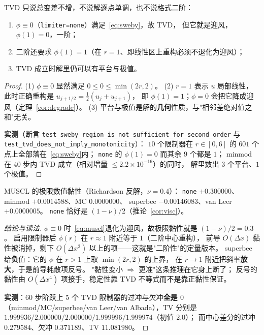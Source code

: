 \begin{theorem}
\label{thm:notmono}
TVD 只说总变差不增，不说解逐点单调，也不说格式二阶：
\begin{enumerate}
  \item $\phi\equiv0$（\texttt{limiter=none}）满足~\eqref{eq:sweby}，故 TVD，
        但它就是迎风，$\phi(1)=0$，一阶；
  \item 二阶还要求 $\phi(1)=1$（在 $r=1$、即线性区上重构必须不退化为迎风）；
  \item TVD 成立时解里仍可以有平台与极值。
\end{enumerate}
\end{theorem}

\begin{proof}
(1) $\phi\equiv0$ 显然满足 $0\le0\le\min(2r,2)$。
(2) $r=1$ 表示 $u$ 局部线性，此时正确重构是 $u_{j+1/2}=\tfrac12(u_j+u_{j+1})$，
即 $\phi(1)=1$；$\phi=0$ 会把它降成迎风（定理~\ref{cor:degrade}）。
(3) 平台与极值是解的\textbf{几何}性质，与"相邻差绝对值之和"无关。

\textbf{实测}（断言 \texttt{test\_sweby\_region\_is\_not\_sufficient\_for\_second\_order}
与 \texttt{test\_tvd\_does\_not\_imply\_monotonicity}）：
$10$ 个限制器在 $r\in[0,6]$ 的 $601$ 个点上全部落在~\eqref{eq:sweby}内；
\texttt{none} 的 $\phi(1)=0$ 而其余 $9$ 个都是 $1$；
minmod 在 $40$ 步内 TVD 成立（相对增量 $\le2.2\times10^{-16}$）的同时，
解里数出 $3$ 个平台、$1$ 个极值。
\end{proof}

\begin{theorem}
\label{thm:limvisc}
MUSCL 的极限数值黏性（Richardson 反解，$\nu=0.4$）：
\texttt{none} $+0.300000$、minmod $+0.0014588$、MC $0.0000000$、
superbee $\mathbf{-0.00146083}$、van Leer $+0.0000005$。
\texttt{none} 恰好是 $(1-\nu)/2$（推论~\ref{cor:visc}）。
\end{theorem}

\begin{proof}[结论与读法]
$\phi\equiv0$ 时~\eqref{eq:muscl}退化为迎风，故极限黏性就是 $(1-\nu)/2=0.3$。
启用限制器后 $\phi(r)$ 在 $r\approx1$ 附近等于 $1$（二阶中心重构），
前导 $O(\Delta x)$ 黏性被消掉，剩下 $O(\Delta x^2)$ 以上的项——这就是"二阶性"的定量版本。
superbee 给\textbf{负}值：它的 $\phi$ 在 $r>1$ 上取 $\min(2r,2)$ 的上界，
在 $r\to1$ 附近把斜率\textbf{放大}，于是前导耗散项反号。
"黏性变小 $\Rightarrow$ 更准"这条推理在它身上断了；
反号的黏性由 $O(\Delta x^4)$ 项接手，稳定性靠 TVD 不等式而不是靠正黏性保证。

\textbf{实测}：$60$ 步阶跃上 $5$ 个 TVD 限制器的过冲与欠冲\textbf{全是 $0$}
（minmod/MC/superbee/van Leer/van Albada），TV 分别是
$1.999936/2.000000/2.000000/1.999996/1.999974$（初值 $2.0$）；
而中心差分的过冲 $0.279584$、欠冲 $0.371189$、TV $11.081980$。
\end{proof}

